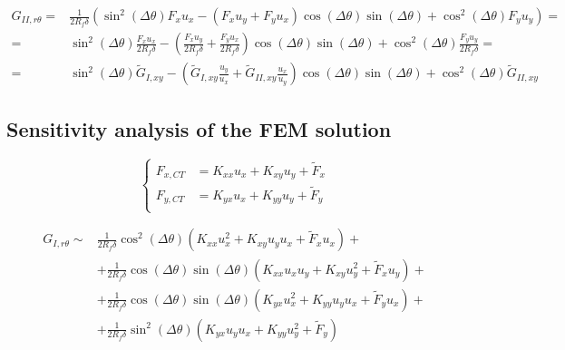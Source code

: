\documentclass[a4paper]{jpconf}
\begin{document}
\begin{equation}
\begin{split}
G_{II,r\theta} =&\frac{1}{2R_{f}\delta}\left(\sin^{2}\left(\Delta\theta\right) F_{x}u_{x}-\left(F_{x}u_{y}+F_{y}u_{x}\right)\cos\left(\Delta\theta\right)\sin\left(\Delta\theta\right)+\cos^{2}\left(\Delta\theta\right)F_{y}u_{y}\right)=\\
=&\sin^{2}\left(\Delta\theta\right)\frac{ F_{x}u_{x}}{2R_{f}\delta}-\left(\frac{F_{x}u_{y}}{2R_{f}\delta}+\frac{F_{y}u_{x}}{2R_{f}\delta}\right)\cos\left(\Delta\theta\right)\sin\left(\Delta\theta\right)+\cos^{2}\left(\Delta\theta\right)\frac{F_{y}u_{y}}{2R_{f}\delta}=\\
=&\sin^{2}\left(\Delta\theta\right)\widetilde{G}_{I,xy}-\left(\widetilde{G}_{I,xy}\frac{u_{y}}{u_{x}}+\widetilde{G}_{II,xy}\frac{u_{x}}{u_{y}}\right)\cos\left(\Delta\theta\right)\sin\left(\Delta\theta\right)+\cos^{2}\left(\Delta\theta\right)\widetilde{G}_{II,xy}
\end{split}
\end{equation}

\subsection{Sensitivity analysis of the FEM solution}

\begin{equation}
\begin{cases}
F_{x,CT}&= K_{xx}u_{x}+K_{xy}u_{y}+\widetilde{F}_{x}\\
F_{y,CT}&= K_{yx}u_{x}+K_{yy}u_{y}+\widetilde{F}_{y}\\
\end{cases}
\end{equation}

\begin{equation}
\begin{split}
G_{I,r\theta} \sim&\frac{1}{2R_{f}\delta}\cos^{2}\left(\Delta\theta\right) \left(K_{xx}u^{2}_{x}+K_{xy}u_{y}u_{x}+\widetilde{F}_{x}u_{x}\right)+\\
&+\frac{1}{2R_{f}\delta}\cos\left(\Delta\theta\right)\sin\left(\Delta\theta\right)\left(K_{xx}u_{x}u_{y}+K_{xy}u^{2}_{y}+\widetilde{F}_{x}u_{y}\right)+\\
&+\frac{1}{2R_{f}\delta}\cos\left(\Delta\theta\right)\sin\left(\Delta\theta\right)\left(K_{yx}u^{2}_{x}+K_{yy}u_{y}u_{x}+\widetilde{F}_{y}u_{x}\right)+\\
&+\frac{1}{2R_{f}\delta}\sin^{2}\left(\Delta\theta\right)\left(K_{yx}u_{y}u_{x}+K_{yy}u^{2}_{y}+\widetilde{F}_{y}\right)
\end{split}
\end{equation}
\end{document}
